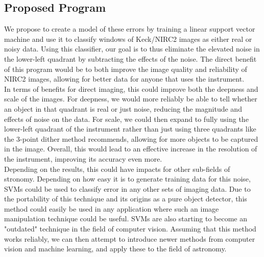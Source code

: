 \documentclass[12pt]{article}
\begin{document}
\subsection*{Proposed Program}
We propose to create a model of these errors by training a linear support vector machine and use it to classify windows of Keck/NIRC2 images as either real or noisy data. Using this classifier, our goal is to thus eliminate the elevated noise in the lower-left quadrant by subtracting the effects of the noise. The direct benefit of this program would be to both improve the image quality and reliability of NIRC2 images, allowing for better data for anyone that uses the instrument.\\
\indent In terms of benefits for direct imaging, this could improve both the deepness and scale of the images. For deepness, we would more reliably be able to tell whether an object in that quadrant is real or just noise, reducing the magnitude and effects of noise on the data. For scale, we could then expand to fully using the lower-left quadrant of the instrument rather than just using three quadrants like the 3-point dither method recommends, allowing for more objects to be captured in the image. Overall, this would lead to an effective increase in the resolution of the instrument, improving its accuracy even more.\\
\indent Depending on the results, this could have impacts for other sub-fields of stronomy. Depending on how easy it is to generate training data for this noise, SVMs could be used to classify error in any other sets of imaging data. Due to the portability of this technique and its origins as a pure object detector, this method could easily be used in any application where such an image manipulation technique could be useful. SVMs are also starting to become an "outdated" technique in the field of computer vision. Assuming that this method works reliably, we can then attempt to introduce newer methods from computer vision and machine learning, and apply these to the field of astronomy. 
\end{document}
